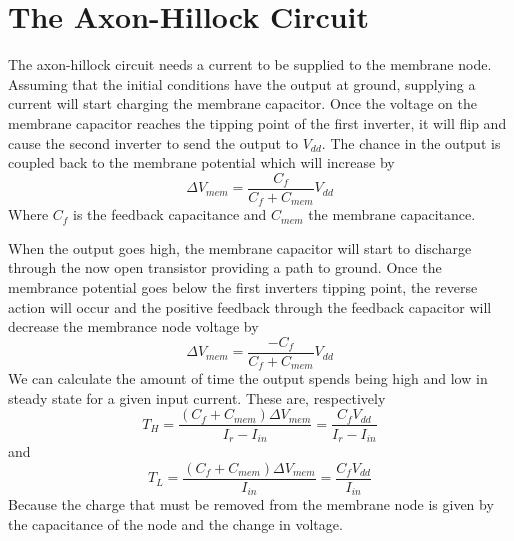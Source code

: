 


\newpage
\section{The Axon-Hillock Circuit}
The axon-hillock circuit needs a current to be supplied to the membrane node. Assuming that the initial conditions have the
output at ground, supplying a current will start charging the membrane capacitor. Once the voltage on the membrane 
capacitor reaches the tipping point of the first inverter, it will flip and cause the second inverter to send the
output to $V_{dd}$. The chance in the output is coupled back to the membrane potential which will increase by 
\begin{equation*}
    \Delta V_{mem} = \frac{C_{f}}{C_f+C_{mem}} V_{dd}
\end{equation*}
Where $C_f$ is the feedback capacitance and $C_{mem}$ the membrane capacitance.

When the output goes high, the membrane capacitor will start to discharge through the now open transistor providing 
a path to ground. Once the membrance potential goes below the first inverters tipping point, the reverse action will 
occur and the positive feedback through the feedback capacitor will decrease the membrance node voltage by 
\begin{equation*}
    \Delta V_{mem} = \frac{-C_{f}}{C_f+C_{mem}} V_{dd}
\end{equation*}
We can calculate the amount of time the output spends being high and low in steady state for a given input current. These
are, respectively
\begin{equation*}
    T_H = \frac{(C_f+C_{mem})\Delta V_{mem}}{I_r-I_{in}} = \frac{C_fV_{dd}}{I_r-I_{in}}
\end{equation*}
and
\begin{equation*}
    T_L = \frac{(C_f+C_{mem})\Delta V_{mem}}{I_{in}} = \frac{C_fV_{dd}}{I_{in}}
\end{equation*}
Because the charge that must be removed from the membrane node is given by the capacitance of the node and the change in 
voltage. 

